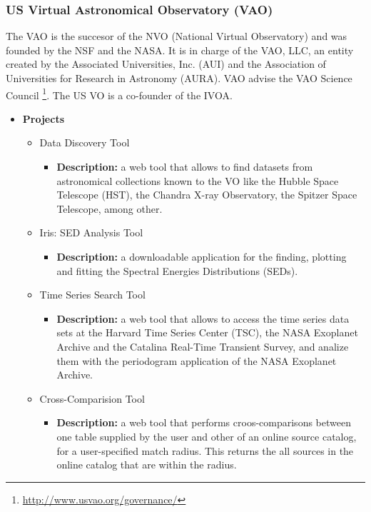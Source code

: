 \subsubsection{US Virtual Astronomical Observatory (VAO)}
The VAO is the succesor of the NVO (National Virtual Observatory) and was
founded by the NSF and the NASA. It is in charge of the VAO, LLC, an entity
created by the Associated Universities, Inc. (AUI) and the Association of
Universities for Research in Astronomy (AURA). VAO advise the VAO Science
Council \footnote{\url{http://www.usvao.org/governance/}}. The US VO is a
co-founder of the IVOA.

\begin{itemize}
\item \textbf{Projects}
\begin{itemize}
\item Data Discovery Tool
\begin{itemize}
\item \textbf{Description:} a web tool that allows to find datasets from
astronomical collections known to the VO like the Hubble Space Telescope (HST),
the Chandra X-ray Observatory, the Spitzer Space Telescope, among other.
\end{itemize}
\item Iris: SED Analysis Tool
\begin{itemize}
\item \textbf{Description:} a downloadable application for the finding, plotting
and fitting the Spectral Energies Distributions (SEDs). 
\end{itemize}
\item Time Series Search Tool
\begin{itemize}
\item \textbf{Description:} a web tool that allows to access the time series
data sets at the Harvard Time Series Center (TSC), the NASA Exoplanet Archive
and the Catalina Real-Time Transient Survey, and analize them with the
periodogram application of the NASA Exoplanet Archive.
\end{itemize}
\item Cross-Comparision Tool
\begin{itemize}
\item \textbf{Description:} a web tool that performs croos-comparisons between
one table supplied by the user and other of an online source catalog, for a
user-specified match radius. This returns the all sources in the online catalog
that are within the radius.
\end{itemize}
\end{itemize}
\end{itemize}

